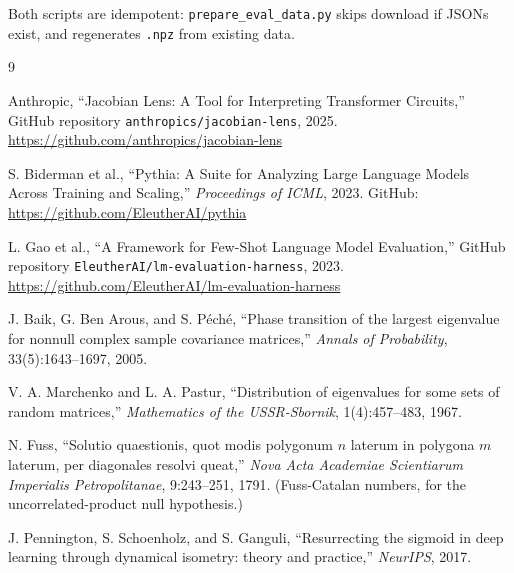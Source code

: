 \documentclass[11pt,a4paper]{article}
\begin{document}
Both scripts are idempotent: \texttt{prepare\_eval\_data.py} skips download if JSONs exist, and regenerates \texttt{.npz} from existing data.


\begin{thebibliography}{9}

Anthropic, ``Jacobian Lens: A Tool for Interpreting Transformer Circuits,'' GitHub repository \texttt{anthropics/jacobian-lens}, 2025. \url{https://github.com/anthropics/jacobian-lens}

S. Biderman et al., ``Pythia: A Suite for Analyzing Large Language Models Across Training and Scaling,'' \emph{Proceedings of ICML}, 2023. GitHub: \url{https://github.com/EleutherAI/pythia}

L. Gao et al., ``A Framework for Few-Shot Language Model Evaluation,'' GitHub repository \texttt{EleutherAI/lm-evaluation-harness}, 2023. \url{https://github.com/EleutherAI/lm-evaluation-harness}

J. Baik, G. Ben Arous, and S. P\'ech\'e, ``Phase transition of the largest eigenvalue for nonnull complex sample covariance matrices,'' \emph{Annals of Probability}, 33(5):1643--1697, 2005.

V. A. Marchenko and L. A. Pastur, ``Distribution of eigenvalues for some sets of random matrices,'' \emph{Mathematics of the USSR-Sbornik}, 1(4):457--483, 1967.

N. Fuss, ``Solutio quaestionis, quot modis polygonum $n$ laterum in polygona $m$ laterum, per diagonales resolvi queat,'' \emph{Nova Acta Academiae Scientiarum Imperialis Petropolitanae}, 9:243--251, 1791. (Fuss-Catalan numbers, for the uncorrelated-product null hypothesis.)

J. Pennington, S. Schoenholz, and S. Ganguli, ``Resurrecting the sigmoid in deep learning through dynamical isometry: theory and practice,'' \emph{NeurIPS}, 2017.

\end{thebibliography}
\end{document}
